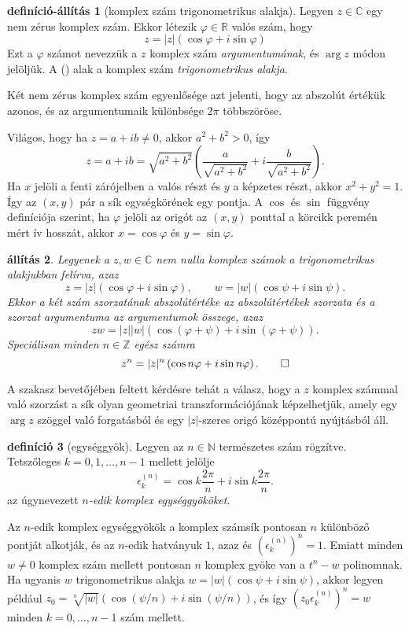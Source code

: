 \documentclass[9pt, showtrims]{memoir}
\makeatletter
\renewenvironment{proof}[1][\proofname]
    {\par\pushQED{\qed}%
    \normalfont \topsep6\p@\@plus6\p@\relax
    \trivlist
    \item[\hskip\labelsep
        \itshape
    #1\@addpunct{:}]\ignorespaces}
    {\popQED\endtrivlist\@endpefalse}
\theoremstyle{plain}
\newtheorem{proposition}{állítás}[section]
\theoremstyle{remark}
\theoremstyle{definition}
\newtheorem{definition}[proposition]{definíció}
\newtheorem{defprop}[proposition]{definíció-állítás}
\renewcommand{\mathbf}{\mathbb}
\makeatother
\begin{document}
\begin{defprop}[komplex szám trigonometrikus alakja]
    Legyen $z\in \mathbf{C}$ egy nem zérus komplex szám.
    Ekkor létezik $\varphi\in\mathbf{R}$ valós szám, hogy
    \[
        z=
        |z|\left( \cos\varphi+i\sin\varphi \right)\tag{\dag}
    \]
    Ezt a $\varphi$ számot nevezzük a $z$ komplex szám \emph{argumentumának}, és $\arg z$ módon jelöljük.
    A (\dag) alak a komplex szám \emph{trigonometrikus alakja}.

    Két nem zérus komplex szám egyenlősége azt jelenti, hogy az abszolút értékük azonos,
    és az argumentumaik különbsége $2\pi$ többszöröse.
\end{defprop}
\begin{proof}
    Világos, hogy ha $z=a+ib\neq 0$, akkor $a^2+b^2>0$, így
    \[
        z=a+ib
        =
        \sqrt{a^2+b^2}\left( \frac{a}{\sqrt{a^2+b^2}}+i\frac{b}{\sqrt{a^2+b^2}} \right).
    \]
    Ha $x$ jelöli a fenti zárójelben a valós részt és $y$ a képzetes részt,
    akkor $x^2+y^2=1$.
    Így az $\left( x,y \right)$ pár a sík egységkörének egy pontja.
    A $\cos$ és $\sin$ függvény definíciója szerint,
    ha $\varphi$ jelöli az origót az $\left( x,y \right)$ 
    ponttal a körcikk peremén mért ív hosszát,
    akkor $x=\cos\varphi$ és $y=\sin\varphi$.
\end{proof}
\begin{proposition}
    Legyenek a $z,w\in \mathbf{C}$ nem nulla komplex számok a trigonometrikus alakjukban felírva, 
    azaz
    \[
        z=|z|\left( \cos\varphi+i\sin\varphi \right),\qquad 
        w=|w|\left( \cos\psi+i\sin\psi \right).
    \]
    Ekkor a két szám szorzatának abszolútértéke az abszolútértékek szorzata
    és a szorzat argumentuma az argumentumok összege, azaz
    \[
        zw=
        |z||w|\left( \cos\left( \varphi+\psi \right)+i\sin\left( \varphi+\psi \right) \right).
    \]
    Speciálisan minden $n\in\mathbf{Z}$ egész számra
    \[
        z^n=|z|^n\left( \cos n\varphi+i\sin n\varphi \right).\qedhere
    \]
\end{proposition}
A szakasz bevetőjében feltett kérdésre tehát a válasz,
hogy a $z$ komplex számmal való szorzást a sík olyan geometriai transzformációjának képzelhetjük,
amely egy $\arg z$ szöggel való forgatásból és egy $|z|$-szeres origó középpontú nyújtásból áll.
\begin{definition}[egységgyök]
    Legyen az $n\in\mathbb{N}$ természetes szám rögzítve.
    Tetszőleges $k=0,1,\dots,n-1$ mellett jelölje
    \[
        \epsilon_k^{(n)}=\cos k\frac{2\pi}{n}+i\sin k\frac{2\pi}{n}.
    \]
    az úgynevezett \emph{$n$-edik komplex egységgyököket}.
\end{definition}
Az $n$-edik komplex egységgyökök a komplex számsík pontosan $n$ különböző pontját alkotják,
és az $n$-edik hatványuk $1$, azaz 
és $(\epsilon_k^{(n)})^n=1$.
Emiatt minden $w\neq 0$ komplex szám mellett pontosan $n$ komplex gyöke van a $t^n-w$ polinomnak.
Ha ugyanis $w$ trigonometrikus alakja $w=|w|\left( \cos\psi+i\sin\psi \right)$,
akkor legyen például $z_0=\sqrt[n]{|w|}\left( \cos(\psi/n)+i\sin(\psi/n) \right)$,
és így $(z_0\epsilon_k^{(n)})^n=w$ minden $k=0,\dots,n-1$ szám mellett.
\end{document}
